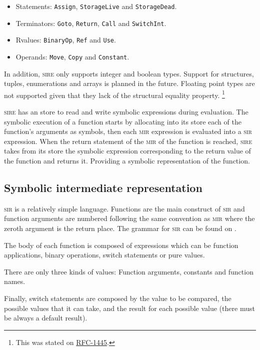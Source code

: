 \begin{itemize}
    \item Statements: \texttt{Assign}, \texttt{StorageLive} and \texttt{StorageDead}.
    \item Terminators: \texttt{Goto}, \texttt{Return}, \texttt{Call} and \texttt{SwitchInt}.
    \item Rvalues: \texttt{BinaryOp}, \texttt{Ref} and \texttt{Use}.
    \item Operands: \texttt{Move}, \texttt{Copy} and \texttt{Constant}.
\end{itemize}

In addition, \textsc{sire} only supports integer and boolean types. Support for
structures, tuples, enumerations and arrays is planned in the future. Floating
point types are not supported given that they lack of the structural equality
property. \footnote{This was stated on
\href{https://github.com/rust-lang/rfcs/blob/master/text/1445-restrict-constants-in-patterns.md}{RFC-1445}.}

\textsc{sire} has an store to read and write symbolic expressions during
evaluation. The symbolic execution of a function starts by allocating into its
store each of the function's arguments as symbols, then each \textsc{mir}
expression is evaluated into a \textsc{sir} expression. When the return
statement of the \textsc{mir} of the function is reached, \textsc{sire} takes
from its store the symbolic expression corresponding to the return value of the
function and returns it. Providing a symbolic representation of the function. 


\subsection{Symbolic intermediate representation}

\textsc{sir} is a relatively simple language. Functions are the main construct
of \textsc{sir} and function arguments are numbered following the same
convention as \textsc{mir} where the zeroth argument is the return place.  The
grammar for \textsc{sir} can be found on .

The body of each function is composed of expressions which can be function
applications, binary operations, switch statements or pure values. 

There are only three kinds of values: Function arguments, constants and
function names. 

Finally, switch statements are composed by the value to be compared, the
possible values that it can take, and the result for each possible value (there
must be always a default result). 

